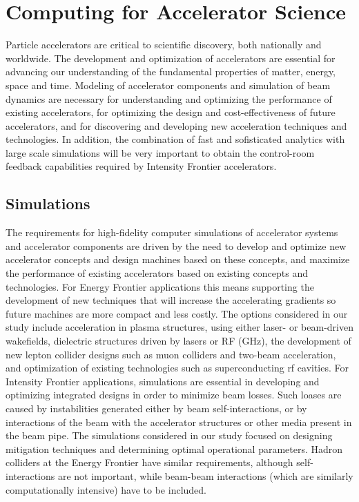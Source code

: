  
\section{Computing for Accelerator Science}

Particle accelerators are critical to scientific discovery, both nationally and worldwide. The development and optimization of accelerators are essential for advancing our understanding of the fundamental properties of matter, energy, space and time. Modeling of accelerator components and simulation of beam dynamics are necessary for understanding and optimizing the performance of existing accelerators, for optimizing the design and cost-effectiveness of future accelerators, and for discovering and developing new acceleration techniques and technologies.  In addition, the combination of fast and sofisticated analytics with large scale simulations will be very important to obtain the control-room feedback capabilities required by Intensity Frontier accelerators.

\subsection{Simulations} \label{subsec:accel-simu}
The requirements for high-fidelity computer simulations of accelerator systems and accelerator components are driven by the need to develop and optimize new accelerator concepts and design machines based on these concepts, and maximize the performance of existing accelerators based on existing concepts and technologies.  For  Energy Frontier applications this means supporting the development of new techniques that will increase the accelerating gradients so future machines are more compact and less costly. The options considered in our study include acceleration in plasma structures, using either laser- or beam-driven wakefields, dielectric structures driven by lasers or RF (GHz), the development of new lepton collider designs such as muon colliders and two-beam acceleration, and optimization of existing technologies such as superconducting rf cavities. For  Intensity Frontier applications, simulations are essential in developing and optimizing integrated designs in order to minimize beam losses.  Such loases are caused by instabilities generated either by beam self-interactions, or by interactions of the beam with the accelerator structures or other media present in the beam pipe.  The simulations considered in our study focused on designing mitigation techniques and determining optimal operational parameters.  Hadron colliders at the Energy Frontier have similar requirements, although self-interactions are not important, while beam-beam interactions (which are similarly computationally intensive) have to be included.  

